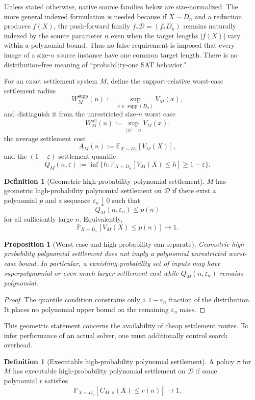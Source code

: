 \documentclass[11pt]{article}
\newtheorem{proposition}[theorem]{Proposition}
\theoremstyle{definition}
\newtheorem{definition}[theorem]{Definition}
\newcommand{\Prob}{\mathbb{P}}
\newcommand{\E}{\mathbb{E}}
\begin{document}
Unless stated otherwise, native source families below are size-normalized. The more general indexed formulation is needed because if $X\sim D_n$ and a reduction produces $f(X)$, the push-forward family $f_*\mathcal D=(f_*D_n)$ remains naturally indexed by the source parameter $n$ even when the target lengths $|f(X)|$ vary within a polynomial bound. Thus no false requirement is imposed that every image of a size-$n$ source instance have one common target length. There is no distribution-free meaning of ``probability-one SAT behavior.''

For an exact settlement system $M$, define the support-relative worst-case settlement radius
\[
W_M^{\mathrm{supp}}(n):=\sup_{x\in\operatorname{supp}(D_n)}V_M(x),
\]
and distinguish it from the unrestricted size-$n$ worst case
\[
W_M^{\mathrm{all}}(n):=\sup_{|x|=n}V_M(x).
\]
the average settlement cost
\[
A_M(n):=\E_{X\sim D_n}[V_M(X)],
\]
and the $(1-\varepsilon)$ settlement quantile
\[
Q_M(n,\varepsilon):=
\inf\{h:\Prob_{X\sim D_n}[V_M(X)\le h]\ge1-\varepsilon\}.
\]

\begin{definition}[Geometric high-probability polynomial settlement]
$M$ has geometric high-probability polynomial settlement on $\mathcal D$ if there exist a polynomial $p$ and a sequence $\varepsilon_n\downarrow0$ such that
\[
Q_M(n,\varepsilon_n)\le p(n)
\]
for all sufficiently large $n$. Equivalently,
\[
\Prob_{X\sim D_n}[V_M(X)\le p(n)]\longrightarrow1.
\]
\end{definition}

\begin{proposition}[Worst case and high probability can separate]
Geometric high-probability polynomial settlement does not imply a polynomial unrestricted worst-case bound. In particular, a vanishing-probability set of inputs may have superpolynomial or even much larger settlement cost while $Q_M(n,\varepsilon_n)$ remains polynomial.
\end{proposition}

\begin{proof}
The quantile condition constrains only a $1-\varepsilon_n$ fraction of the distribution. It places no polynomial upper bound on the remaining $\varepsilon_n$ mass.
\end{proof}

This geometric statement concerns the availability of cheap settlement routes. To infer performance of an actual solver, one must additionally control search overhead.

\begin{definition}[Executable high-probability polynomial settlement]
A policy $\pi$ for $M$ has executable high-probability polynomial settlement on $\mathcal D$ if some polynomial $r$ satisfies
\[
\Prob_{X\sim D_n}[C_{M,\pi}(X)\le r(n)]\longrightarrow1.
\]
\end{definition}
\end{document}
